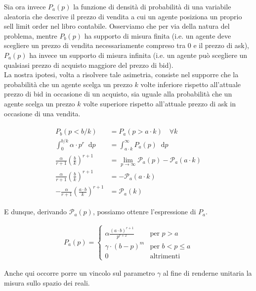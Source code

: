 \documentclass[paper=a4, fontsize=11pt]{scrartcl}
\newcommand*\diff{\mathop{}\!\mathrm{d}}
\numberwithin{equation}{section}
\numberwithin{figure}{section}
\numberwithin{table}{section}
\begin{document}
Sia ora invece $P_a(p)$ la funzione di densità di probabilità di una variabile aleatoria che descrive il prezzo di vendita a cui un agente posiziona un proprio sell limit order nel libro contabile. Osserviamo che per via della natura del problema, mentre $P_b(p)$ ha supporto di misura finita (i.e. un agente deve scegliere un prezzo di vendita necessariamente compreso tra $0$ e il prezzo di ask), $P_a(p)$ ha invece un supporto di misura infinita (i.e. un agente può scegliere un qualsiasi prezzo di acquisto maggiore del prezzo di bid).\\

La nostra ipotesi, volta a risolvere tale asimetria, consiste nel supporre che la probabilità che un agente scelga un prezzo $k$ volte inferiore rispetto all'attuale prezzo di bid in occasione di un acquisto, sia uguale alla probabilità che un agente scelga un prezzo $k$ volte superiore rispetto all'attuale prezzo di ask in occasione di una vendita.

\begin{align}
\begin{split}
P_b(p < b / k) & = P_a(p > a \cdot k) \quad \forall k \\
\int_0^{b/k} \alpha \cdot p^r \diff p & = \int_{a \cdot k}^\infty P_a(p) \diff p \\
\frac{\alpha}{r+1} \left(\frac{b}{k}\right)^{r+1} & = \lim_{p \to \infty} \mathcal{P}_a(p) - \mathcal{P}_a(a \cdot k) \\
\frac{\alpha}{r+1} \left(\frac{b}{k}\right)^{r+1} & = - \mathcal{P}_a(a \cdot k) \\
- \frac{\alpha}{r+1} \left(\frac{a \cdot b}{k}\right)^{r+1} & = \mathcal{P}_a(k)
\end{split}
\end{align}

E dunque, derivando $\mathcal{P}_a(p)$, possiamo ottenre l'espressione di $P_a$.

\begin{align}
P_a(p) = \left\{\begin{array}{ll}
         \alpha  \frac{(a \cdot b)^{r+1}}{p^{r+2}}  & \text{per } p > a \\
         \gamma  \cdot (b - p)^m                    & \text{per } b < p \leq a \\
         0   & \text{altrimenti } \end{array}\right.
\end{align}

Anche qui occorre porre un vincolo sul parametro $\gamma$ al fine di renderne unitaria la misura sullo spazio dei reali.
\end{document}
